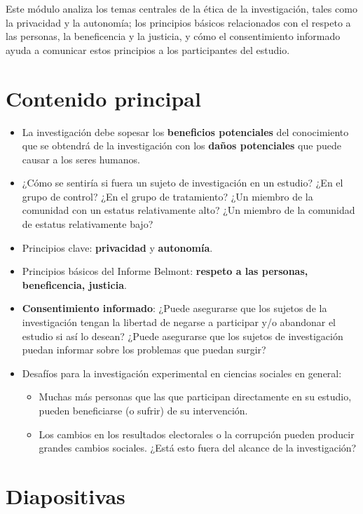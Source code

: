 \documentclass[12pt,spanish,]{book}
\begin{document}
Este módulo analiza los temas centrales de la ética de la investigación, tales como la privacidad y la autonomía; los principios básicos relacionados con el respeto a las personas, la beneficencia y la justicia, y cómo el consentimiento informado ayuda a comunicar estos principios a los participantes del estudio.

\hypertarget{contenido-principal-8}{%
\section{Contenido principal}\label{contenido-principal-8}}

\begin{itemize}
\item
  La investigación debe sopesar los \textbf{beneficios potenciales} del conocimiento que se obtendrá de la investigación con los \textbf{daños potenciales} que puede causar a los seres humanos.
\item
  ¿Cómo se sentiría si fuera un sujeto de investigación en un estudio? ¿En el grupo de control? ¿En el grupo de tratamiento? ¿Un miembro de la comunidad con un estatus relativamente alto? ¿Un miembro de la comunidad de estatus relativamente bajo?
\item
  Principios clave: \textbf{privacidad} y \textbf{autonomía}.
\item
  Principios básicos del Informe Belmont: \textbf{respeto a las personas, beneficencia, justicia}.
\item
  \textbf{Consentimiento informado}: ¿Puede asegurarse que los sujetos de la investigación tengan la libertad de negarse a participar y/o abandonar el estudio si así lo desean? ¿Puede asegurarse que los sujetos de investigación puedan informar sobre los problemas que puedan surgir?
\item
  Desafíos para la investigación experimental en ciencias sociales en general:

  \begin{itemize}
  \item
    Muchas más personas que las que participan directamente en su estudio, pueden beneficiarse (o sufrir) de su intervención.
  \item
    Los cambios en los resultados electorales o la corrupción pueden producir grandes cambios sociales. ¿Está esto fuera del alcance de la investigación?
  \end{itemize}
\end{itemize}

\hypertarget{diapositivas-8}{%
\section{Diapositivas}\label{diapositivas-8}}
\end{document}
